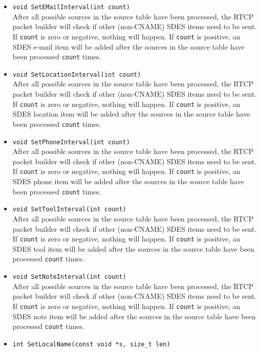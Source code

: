 \documentclass[12pt,a4paper]{article}
\begin{document}
\begin{itemize}
					\item {\tt void SetEMailInterval(int count)}\\
						After all possible sources in the source table have been
						processed, the RTCP packet builder will check if other (non-CNAME) SDES 
						items need to be sent. If {\tt count} is zero or negative, nothing
						will happen. If {\tt count} is positive, an SDES e-mail
						item will be added after the sources in the source table have
						been processed {\tt count} times.
					\item {\tt void SetLocationInterval(int count)}\\
						After all possible sources in the source table have been
						processed, the RTCP packet builder will check if other (non-CNAME) SDES 
						items need to be sent. If {\tt count} is zero or negative, nothing
						will happen. If {\tt count} is positive, an SDES location
						item will be added after the sources in the source table have
						been processed {\tt count} times.
					\item {\tt void SetPhoneInterval(int count)}\\
						After all possible sources in the source table have been
						processed, the RTCP packet builder will check if other (non-CNAME) SDES 
						items need to be sent. If {\tt count} is zero or negative, nothing
						will happen. If {\tt count} is positive, an SDES phone
						item will be added after the sources in the source table have
						been processed {\tt count} times.
					\item {\tt void SetToolInterval(int count)}\\
						After all possible sources in the source table have been
						processed, the RTCP packet builder will check if other (non-CNAME) SDES 
						items need to be sent. If {\tt count} is zero or negative, nothing
						will happen. If {\tt count} is positive, an SDES tool
						item will be added after the sources in the source table have
						been processed {\tt count} times.
					\item {\tt void SetNoteInterval(int count)}\\
						After all possible sources in the source table have been
						processed, the RTCP packet builder will check if other (non-CNAME) SDES 
						items need to be sent. If {\tt count} is zero or negative, nothing
						will happen. If {\tt count} is positive, an SDES note
						item will be added after the sources in the source table have
						been processed {\tt count} times.
					\item {\tt int SetLocalName(const void *s, size\_t len)}\\

\end{itemize}
\end{document}
